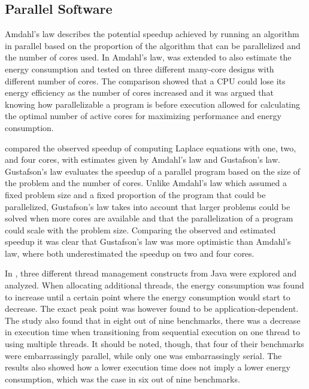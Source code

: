 \subsection{Parallel Software}

Amdahl's law describes the potential speedup achieved by running an algorithm in parallel based on the proportion of the algorithm that can be parallelized and the number of cores used.\cite{amdahl1967validity} In \cite{woo2008extending} Amdahl's law, was extended to also estimate the energy consumption and tested on three different many-core designs with different number of cores. The comparison showed that a CPU could lose its energy efficiency as the number of cores increased and it was argued that knowing how parallelizable a program is before execution allowed for calculating the optimal number of active cores for maximizing performance and energy consumption.\cite{woo2008extending}

\cite{prinslow2011overview} compared the observed speedup of computing Laplace equations with one, two, and four cores, with estimates given by Amdahl's law and Gustafson's law. Gustafson's law evaluates the speedup of a parallel program based on the size of the problem and the number of cores. Unlike Amdahl's law which assumed a fixed problem size and a fixed proportion of the program that could be parallelized, Gustafson's law takes into account that larger problems could be solved when more cores are available and that the parallelization of a program could scale with the problem size. Comparing the observed and estimated speedup it was clear that Gustafson's law was more optimistic than Amdahl's law, where both underestimated the speedup on two and four cores.\cite{prinslow2011overview}


In \cite{Pinto2014}, three different thread management constructs from Java were explored and analyzed. When allocating additional threads, the energy consumption was found to increase until a certain point where the energy consumption would start to decrease. The exact peak point was however found to be application-dependent. The study also found that in eight out of nine benchmarks, there was a decrease in execution time when transitioning from sequential execution on one thread to using multiple threads. It should be noted, though, that four of their benchmarks were embarrassingly parallel, while only one was embarrassingly serial. The results also showed how a lower execution time does not imply a lower energy consumption, which was the case in six out of nine benchmarks.\cite{Pinto2014}

